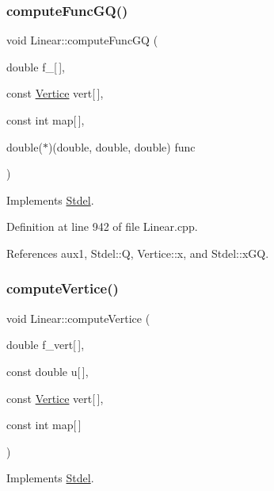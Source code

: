 \subsubsection{\texorpdfstring{compute\+Func\+G\+Q()}{computeFuncGQ()}}
{\footnotesize\ttfamily void Linear\+::compute\+Func\+GQ (\begin{DoxyParamCaption}\item[{double}]{f\+\_\+\mbox{[}$\,$\mbox{]},  }\item[{const \hyperlink{structVertice}{Vertice}}]{vert\mbox{[}$\,$\mbox{]},  }\item[{const int}]{map\mbox{[}$\,$\mbox{]},  }\item[{double($\ast$)(double, double, double)}]{func }\end{DoxyParamCaption})\hspace{0.3cm}{\ttfamily [virtual]}}



Implements \hyperlink{classStdel_a59195ad1ce9b90ef83fd935698dc3305}{Stdel}.



Definition at line 942 of file Linear.\+cpp.



References aux1, Stdel\+::Q, Vertice\+::x, and Stdel\+::x\+GQ.

\mbox{\label{classLinear_a4a1185c65f66ed46704c347af184b922}} 
\subsubsection{\texorpdfstring{compute\+Vertice()}{computeVertice()}}
{\footnotesize\ttfamily void Linear\+::compute\+Vertice (\begin{DoxyParamCaption}\item[{double}]{f\+\_\+vert\mbox{[}$\,$\mbox{]},  }\item[{const double}]{u\mbox{[}$\,$\mbox{]},  }\item[{const \hyperlink{structVertice}{Vertice}}]{vert\mbox{[}$\,$\mbox{]},  }\item[{const int}]{map\mbox{[}$\,$\mbox{]} }\end{DoxyParamCaption})\hspace{0.3cm}{\ttfamily [virtual]}}



Implements \hyperlink{classStdel_a74eed41f670878759c84e2014b4a2cd5}{Stdel}.



